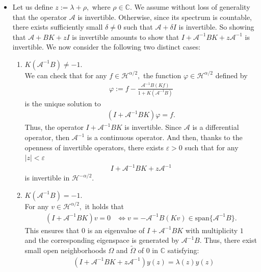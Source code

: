 \documentclass[11pt, dvipsnames]{amsart}
\begin{document}
\begin{itemize}
    \item Let us define $z:=\lambda+\rho,$ where $\rho\in \mathbb{C}$. We assume without loss of generality that the operator $\mathcal{A}$ is invertible. Otherwise, since its spectrum is countable, there exists sufficiently small $\delta\neq 0$ such that $\mathcal{A}+\delta I$ is invertible. So showing that $\mathcal{A}+BK+zI$ is invertible amounts to show that $I+\mathcal{A}^{-1}BK+z\mathcal{A}^{-1}$ is invertible. We now consider the following two distinct cases:
    \begin{enumerate}
        \item [(a)] $K(\mathcal{A}^{-1}B)\neq -1.$\\
        We can check that for any $f\in\mathcal{H}^{\alpha/2},$ the function $\varphi\in \mathcal{H}^{\alpha/2}$ defined by
        \begin{align*}
            \varphi:=f-\frac{\mathcal{A}^{-1}B(Kf)}{1+K(\mathcal{A}^{-1}B)}
        \end{align*} is the unique solution to 
        \begin{align*}
            (I+\mathcal{A}^{-1}BK)\varphi=f.
        \end{align*} 
        Thus, the operator $I+\mathcal{A}^{-1}BK$ is invertible. Since $\mathcal{A}$ is a differential operator, then $\mathcal{A}^{-1}$ is a continuous operator. And then, thanks to the openness of invertible operators, there exists $\varepsilon>0$ such that for any $|z|<\varepsilon$
        \begin{align}
        I+\mathcal{A}^{-1}BK+z\mathcal{A}^{-1}
        \end{align} is invertible in $\mathcal{H}^{-\alpha/2}.$
        \item[(b)] $K(\mathcal{A}^{-1}B)= -1.$\\
        For any $v\in \mathcal{H}^{\alpha/2},$ it holds that
        \begin{align*}
            (I+\mathcal{A}^{-1}BK)v=0&\Leftrightarrow v=-\mathcal{A}^{-1}B(Kv)\in \text{span}\{\mathcal{A}^{-1}B\}.
        \end{align*} This ensures that $0$ is an eigenvalue of $I+\mathcal{A}^{-1}BK$ with multiplicity $1$ and the corresponding eigenspace is generated by $\mathcal{A}^{-1}B.$ Thus, there exist small open neighborhoods $\Omega$ and $\tilde \Omega$ of $0$ in $\mathbb{C}$ satisfying:
        \begin{align}
            &(I+\mathcal{A}^{-1}BK+z\mathcal{A}^{-1})y(z)=\lambda(z)y(z)\label{I-appendix}\\

\end{align}
\end{enumerate}
\end{itemize}
\end{document}
